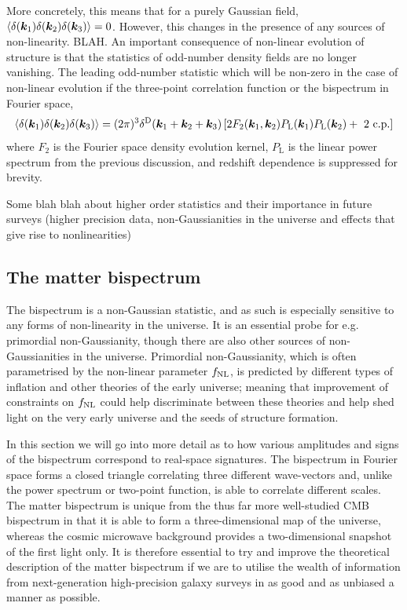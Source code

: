 More concretely, this means that for a purely Gaussian field, $\langle \delta(\bm {k}_1) \delta(\bm {k}_2) \delta(\bm {k}_3)\rangle = 0$. However, this changes in the presence of any sources of non-linearity. BLAH. An important consequence of non-linear evolution of structure is that the statistics of odd-number density fields are no longer vanishing. The leading odd-number statistic which will be non-zero in the case of non-linear evolution if the three-point correlation function or the bispectrum in Fourier space, 
\begin{equation}
	\langle \delta(\bm {k}_1) \delta(\bm {k}_2) \delta(\bm {k}_3) \rangle = (2 \pi )^3 \delta^\mathrm{D}(\bm {k}_1 + \bm {k}_2 + \bm {k}_3) \left[ 2 F_2(\bm {k}_1,\bm {k}_2) P_\mathrm{L}(\bm {k}_1) P_\mathrm{L}(\bm {k}_2) + \text{ 2 c.p.} \right]
\end{equation}
where $F_2$ is the Fourier space density evolution kernel, $P_\mathrm{L}$ is the linear power spectrum from the previous discussion, and redshift dependence is suppressed for brevity. 

Some blah blah about higher order statistics and their importance in future surveys (higher precision data, non-Gaussianities in the universe and effects that give rise to nonlinearities)

\subsection{The matter bispectrum}

The bispectrum is a non-Gaussian statistic, and as such is especially sensitive to any forms of non-linearity in the universe. It is an essential probe for e.g. primordial non-Gaussianity, though there are also other sources of non-Gaussianities in the universe. Primordial non-Gaussianity, which is often parametrised by the non-linear parameter $f_\text{NL}$, is predicted by different types of inflation and other theories of the early universe; meaning that improvement of constraints on $f_\text{NL}$ could help discriminate between these theories and help shed light on the very early universe and the seeds of structure formation. 

In this section we will go into more detail as to how various amplitudes and signs of the bispectrum correspond to real-space signatures. The bispectrum in Fourier space forms a closed triangle correlating three different wave-vectors and, unlike the power spectrum or two-point function, is able to correlate different scales. The matter bispectrum is unique from the thus far more well-studied CMB bispectrum in that it is able to form a three-dimensional map of the universe, whereas the cosmic microwave background provides a two-dimensional snapshot of the first light only. It is therefore essential to try and improve the theoretical description of the matter bispectrum if we are to utilise the wealth of information from next-generation high-precision galaxy surveys in as good and as unbiased a manner as possible. 

